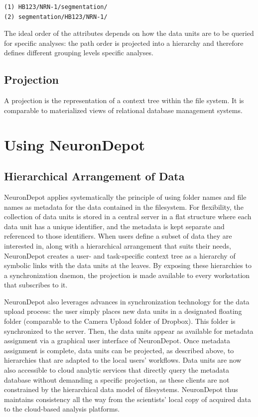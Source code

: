 \documentclass{frontiersSCNS} %
\begin{document}
\begin{lstlisting}[style=display]
(1) HB123/NRN-1/segmentation/
(2) segmentation/HB123/NRN-1/
\end{lstlisting}


The ideal order of the attributes depends on how the data units are to be
queried for specific analyses: the path order is projected into a hierarchy and
therefore defines different grouping levels specific analyses.


\subsection{Projection}

A projection is the representation of a context tree within the file system. It
is comparable to materialized views of relational database management systems.

\section{Using NeuronDepot}

\subsection{Hierarchical Arrangement of Data}

NeuronDepot applies systematically the principle of using folder names and file
names as metadata for the data contained in the filesystem. For flexibility,
the collection of data units is stored in a central server in a flat structure
where each data unit has a unique identifier, and the metadata is kept separate
and referenced to those identifiers. When users define a subset of data they
are interested in, along with a hierarchical arrangement that suits their
needs, NeuronDepot creates a user- and task-specific context tree as a
hierarchy of symbolic links with the data units at the leaves. By exposing
these hierarchies to a synchronization daemon, the projection is made available
to every workstation that subscribes to it.

NeuronDepot also leverages advances in synchronization technology for the data
upload process: the user simply places new data units in a designated floating
folder (comparable to the Camera Upload folder of Dropbox). This folder is
synchronized to the server. Then, the data units appear as available for
metadata assignment via a graphical user interface of NeuronDepot. Once
metadata assignment is complete, data units can be projected, as described
above, to hierarchies that are adapted to the local users' workflows. Data
units are now also accessible to cloud analytic services that directly query
the metadata database without demanding a specific projection, as these clients
are not constrained by the hierarchical data model of filesystems. NeuronDepot
thus maintains consistency all the way from the scientists' local copy of
acquired data to the cloud-based analysis platforms.
\end{document}
